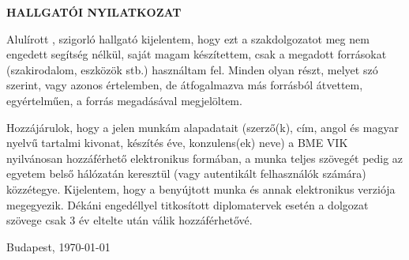 \begin{center}
\large
\textbf{HALLGATÓI NYILATKOZAT}\\
\end{center}

Alulírott \emph{\vikszerzo}, szigorló hallgató kijelentem,
hogy ezt a szakdolgozatot meg nem engedett segítség nélkül,
saját magam készítettem, csak a megadott forrásokat
(szakirodalom, eszközök stb.) használtam fel.
Minden olyan részt, melyet szó szerint, vagy azonos értelemben,
de átfogalmazva más forrásból átvettem, egyértelműen,
a forrás megadásával megjelöltem.

Hozzájárulok, hogy a jelen munkám alapadatait (szerző(k), cím, angol és
magyar nyelvű tartalmi kivonat, készítés éve, konzulens(ek) neve) a BME VIK
nyilvánosan hozzáférhető elektronikus formában,
a munka teljes szövegét pedig az egyetem belső hálózatán keresztül
(vagy autentikált felhasználók számára) közzétegye. Kijelentem, hogy a
benyújtott munka és annak elektronikus verziója megegyezik.
Dékáni engedéllyel titkosított diplomatervek esetén a dolgozat szövege
csak 3 év eltelte után válik hozzáférhetővé.

\begin{flushleft}
\vspace*{1cm}
Budapest, \today
\end{flushleft}

\begin{flushright}
 \vspace*{1cm}
 \makebox[7cm]{\rule{6cm}{.4pt}}\\
 \makebox[7cm]{\emph{\vikszerzo}}\\
\end{flushright}
\thispagestyle{empty}

\vfill
\clearpage
\thispagestyle{empty}
